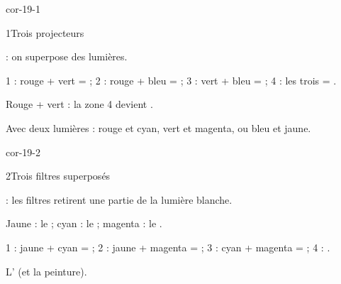 \corrigesSouples

\begin{blocLivre}{cor-19-1}
\begin{corrige}{1}{Trois projecteurs}
\begin{questions}
\item {} : on superpose des lumières.
\item 1 : rouge + vert =  ; 2 : rouge + bleu =  ; 3 : vert + bleu =  ; 4 : les trois = .
\item Rouge + vert : la zone 4 devient .
\item Avec deux lumières  : rouge et cyan, vert et magenta, ou bleu et jaune.
\end{questions}
\end{corrige}
\end{blocLivre}
\begin{blocLivre}{cor-19-2}
\begin{corrige}{2}{Trois filtres superposés}
\begin{questions}
\item {} : les filtres retirent une partie de la lumière blanche.
\item Jaune : le  ; cyan : le  ; magenta : le .
\item 1 : jaune + cyan =  ; 2 : jaune + magenta =  ; 3 : cyan + magenta =  ; 4 : .
\item L' (et la peinture).
\end{questions}
\end{corrige}
\end{blocLivre}

